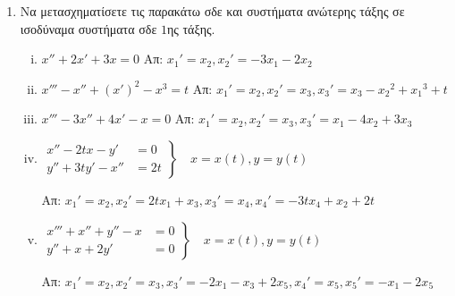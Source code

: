 


\everymath{\displaystyle}




\thispagestyle{empty}

\begin{center}
\end{center}

\vspace{\baselineskip}

\begin{enumerate}
\setlength{\itemsep}{\baselineskip}
\item Να μετασχηματίσετε τις παρακάτω σδε και συστήματα ανώτερης τάξης σε ισοδύναμα συστήματα σδε $1$ης τάξης.

\begin{enumerate}[i)]
\setlength{\itemsep}{\baselineskip}
  \item $x''+2x'+3x=0$ \hfill Απ: ${x_{1}}'= x_{2}, {x_{2}}'=-3x_{1}-2x_{2}$

  \item $x'''-x''+(x')^{2}-x^{3}=t$ \hfill Απ: ${x_{1}}'= x_{2}, {x_{2}}'=x_{3}, {x_{3}}'=x_{3}-{x_{2}}^{2}+{x_{1}}^{3}+t$

  \item $x'''-3x''+4x'-x=0$ \hfill Απ: ${x_{1}}'= x_{2}, {x_{2}}'=x_{3}, {x_{3}}'=x_{1}-4x_{2}+3x_{3}$

  \item
  \(
  \left.
  \begin{aligned}
    x''- 2tx - y'  &=0 \\
    y''+3ty' -x'' &=2t
  \end{aligned}
  \right\}\quad x=x(t), y=y(t)
  \)

\hfill Απ: ${x_{1}}'= x_{2}, {x_{2}}'=2tx_{1}+x_{3}, {x_{3}}'=x_{4}, {x_{4}}'=-3tx_{4}+x_{2}+2t$


\item
\(
\left.
\begin{aligned}
  x'''+ x'' + y'' - x &=0 \\
  y''+x +2y' &=0
\end{aligned}
\right\}\quad x=x(t), y=y(t)
\)

\hfill Απ: ${x_{1}}'= x_{2}, {x_{2}}'=x_{3}, {x_{3}}'=-2x_{1}-x_{3}+2x_{5}, {x_{4}}'=x_{5}, {x_{5}}'=-x_{1}-2x_{5}$

\end{enumerate}


\end{enumerate}


